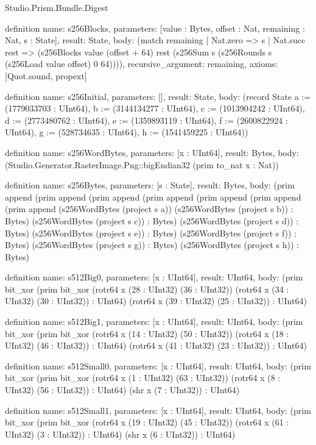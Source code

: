 \begin{lexlean}{Studio.Prism.Bundle.Digest}
\begin{semanticmodule}
definition{
  name: s256Blocks,
  parameters: [value : Bytes, offset : Nat, remaining : Nat, s : State],
  result: State,
  body: (match remaining
    | Nat.zero => s
    | Nat.succ rest => (s256Blocks value (offset + 64) rest (s256Sum s (s256Rounds s (s256Load value offset) 0 64)))),
  recursive_argument: remaining,
  axioms: [Quot.sound, propext]
}

definition{
  name: s256Initial,
  parameters: [],
  result: State,
  body: (record State {a := (1779033703 : UInt64), b := (3144134277 : UInt64), c := (1013904242 : UInt64), d := (2773480762 : UInt64), e := (1359893119 : UInt64), f := (2600822924 : UInt64), g := (528734635 : UInt64), h := (1541459225 : UInt64)})
}

definition{
  name: s256WordBytes,
  parameters: [x : UInt64],
  result: Bytes,
  body: (Studio.Generator.RasterImage.Png::bigEndian32 (prim to_nat x : Nat))
}

definition{
  name: s256Bytes,
  parameters: [s : State],
  result: Bytes,
  body: (prim append (prim append (prim append (prim append (prim append (prim append (prim append (s256WordBytes (project s a)) (s256WordBytes (project s b)) : Bytes) (s256WordBytes (project s c)) : Bytes) (s256WordBytes (project s d)) : Bytes) (s256WordBytes (project s e)) : Bytes) (s256WordBytes (project s f)) : Bytes) (s256WordBytes (project s g)) : Bytes) (s256WordBytes (project s h)) : Bytes)
}

definition{
  name: s512Big0,
  parameters: [x : UInt64],
  result: UInt64,
  body: (prim bit_xor (prim bit_xor (rotr64 x (28 : UInt32) (36 : UInt32)) (rotr64 x (34 : UInt32) (30 : UInt32)) : UInt64) (rotr64 x (39 : UInt32) (25 : UInt32)) : UInt64)
}

definition{
  name: s512Big1,
  parameters: [x : UInt64],
  result: UInt64,
  body: (prim bit_xor (prim bit_xor (rotr64 x (14 : UInt32) (50 : UInt32)) (rotr64 x (18 : UInt32) (46 : UInt32)) : UInt64) (rotr64 x (41 : UInt32) (23 : UInt32)) : UInt64)
}

definition{
  name: s512Small0,
  parameters: [x : UInt64],
  result: UInt64,
  body: (prim bit_xor (prim bit_xor (rotr64 x (1 : UInt32) (63 : UInt32)) (rotr64 x (8 : UInt32) (56 : UInt32)) : UInt64) (shr x (7 : UInt32)) : UInt64)
}

definition{
  name: s512Small1,
  parameters: [x : UInt64],
  result: UInt64,
  body: (prim bit_xor (prim bit_xor (rotr64 x (19 : UInt32) (45 : UInt32)) (rotr64 x (61 : UInt32) (3 : UInt32)) : UInt64) (shr x (6 : UInt32)) : UInt64)
}


\end{semanticmodule}
\end{lexlean}
